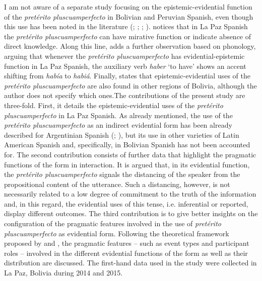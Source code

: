 \documentclass[output=paper]{langsci/langscibook}
\begin{document}
I am not aware of a separate study focusing on the epistemic-evidential function of the \textit{pretérito pluscuamperfecto} in Bolivian and Peruvian Spanish, even though this use has been noted in the literature (\citealt[222--225]{Laprade1981}; \citealt[196--203]{Mendoza1991}; \citealt[306--308]{CallisayaApaza2012}; \citealt{Adelaar2004}). \citet[223]{Laprade1981} notices that in La Paz Spanish the \textit{pretérito pluscuamperfecto} can have mirative function or indicate absence of direct knowledge. Along this line, \citet[199]{Mendoza1991} adds a further observation based on phonology, arguing that whenever the \textit{pretérito pluscuamperfecto} has evidential-epistemic function in La Paz Spanish, the auxiliary verb \textit{haber} ‘to have’ shows an accent shifting from \textit{había} to \textit{habiá}. Finally, \citet[307]{CallisayaApaza2012} states that epistemic-evidential uses of the \textit{pretérito pluscuamperfecto} are also found in other regions of Bolivia, although the author does not specify which ones.The contributions of the present study are three-fold. First, it details the epistemic-evidential uses of the \textit{pretérito pluscuamperfecto} in La Paz Spanish. As already mentioned, the use of the \textit{pretérito pluscuamperfecto} as an indirect evidential form has been already described for Argentinian Spanish (\citealt{Speranza2014}; \citealt{Bermudez2008}), but its use in other varieties of Latin American Spanish and, specifically, in Bolivian Spanish has not been accounted for. The second contribution consists of further data that highlight the pragmatic functions of the form in interaction. It is argued that, in its evidential function, the \textit{pretérito pluscuamperfecto} signals the distancing of the speaker from the propositional content of the utterance. Such a distancing, however, is not necessarily related to a low degree of commitment to the truth of the information and, in this regard, the evidential uses of this tense, i.e. inferential or reported, display different outcomes. The third contribution is to give better insights on the configuration of the pragmatic features involved in the use of \textit{pretérito pluscuamperfecto} as evidential form. Following the theoretical framework proposed by \citet{Kockelman2004} and \citet{Bergqvist2018c}, the pragmatic features – such as event types and participant roles – involved in the different evidential functions of the form as well as their distribution are discussed. The first-hand data used in the study were collected in La Paz, Bolivia during 2014 and 2015.
\end{document}
